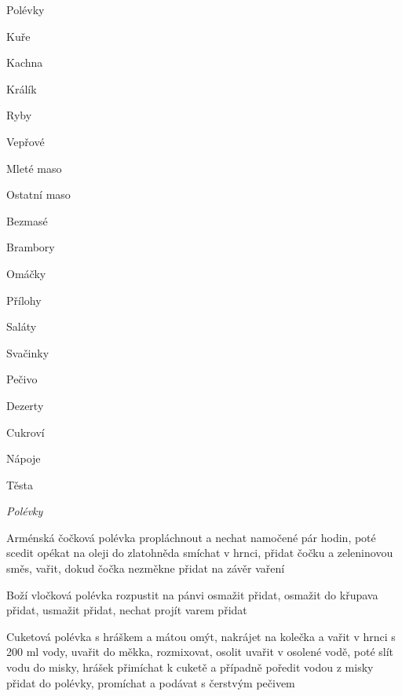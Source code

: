 \documentclass[12pt,a4paper]{article}
\begin{document}
\vspace*{\fill}
{\Huge\it
\centerline{Polévky}
\centerline{Kuře}
\centerline{Kachna}
\centerline{Králík}
\centerline{Ryby}
\centerline{Vepřové}
\centerline{Mleté maso}
\centerline{Ostatní maso}
\centerline{Bezmasé}
\centerline{Brambory}
\centerline{Omáčky}
\centerline{Přílohy}
\centerline{Saláty}
\centerline{Svačinky}
\centerline{Pečivo}
\centerline{Dezerty}
\centerline{Cukroví}
\centerline{Nápoje}
\centerline{Těsta}
}
\vspace*{\fill}
\newpage

\vspace*{\fill}
\hfill {\Huge\it Polévky}\hfill
\vspace*{\fill}
\newpage

\begin{recipe}{Arménská čočková polévka}
   propláchnout a nechat namočené pár hodin, poté scedit
   opékat na oleji do zlatohněda
   smíchat v hrnci, přidat čočku a zeleninovou směs, vařit, dokud čočka nezměkne
   přidat na závěr vaření
\end{recipe}
\newpage

\begin{recipe}{Boží vločková polévka}
    rozpustit na pánvi
    osmažit
    přidat, osmažit do křupava
    přidat, usmažit
    přidat, nechat projít varem
    přidat
\end{recipe}
\newpage

\begin{recipe}{Cuketová polévka s hráškem a mátou}
   omýt, nakrájet na kolečka a vařit v hrnci s 200 ml vody, uvařit do měkka, rozmixovat, osolit
   uvařit v osolené vodě, poté slít vodu do misky, hrášek přimíchat k cuketě a případně poředit vodou z misky
   přidat do polévky, promíchat a podávat s čerstvým pečivem
\end{recipe}
\newpage
\end{document}
